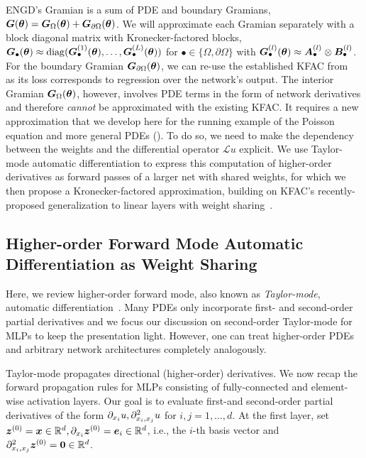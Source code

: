 ENGD's Gramian is a sum of PDE and boundary Gramians, ${\bm{G}}({\bm{\theta}})= {\bm{G}}_\Omega({\bm{\theta}}) + {\bm{G}}_{\partial\Omega}({\bm{\theta}})$.
We will approximate each Gramian separately with a block diagonal matrix with Kronecker-factored blocks, ${\bm{G}}_{\bullet}({\bm{\theta}}) \approx \operatorname{diag}({\bm{G}}^{(1)}_{\bullet}({\bm{\theta}}), \dots, {\bm{G}}^{(L)}_{\bullet}({\bm{\theta}}))$ for $\bullet \in \{\Omega, \partial\Omega\}$ with ${\bm{G}}^{(l)}_{\bullet}({\bm{\theta}}) \approx {\bm{A}}^{(l)}_{\bullet} \otimes {\bm{B}}^{(l)}_{\bullet}$.
For the boundary Gramian ${\bm{G}}_{\partial\Omega}({\bm{\theta}})$, we can re-use the established KFAC from~ as its loss corresponds to regression over the network's output.
The interior Gramian ${\bm{G}}_\Omega({\bm{\theta}})$, however, involves PDE terms in the form of network derivatives and therefore \emph{cannot} be approximated with the existing KFAC.
It requires a new approximation that we develop here for the running example of the Poisson equation and more general PDEs ().
To do so, we need to make the dependency between the weights and the differential operator $\mathcal{L}u$ explicit.
We use Taylor-mode automatic differentiation to express this computation of higher-order derivatives as forward passes of a larger net with shared weights, for which we then propose a Kronecker-factored approximation, building on KFAC's recently-proposed generalization to linear layers with weight sharing~\cite{eschenhagen2023kroneckerfactored}.

\subsection{Higher-order Forward Mode Automatic Differentiation as Weight Sharing}\label{sec:taylor-mode-AD}

Here, we review higher-order forward mode, also known as \emph{Taylor-mode}, automatic differentiation~\citep[][tutorial in ]{griewank1996algorithm, griewank2008evaluating, bettencourt2019taylor}.
Many PDEs only incorporate first- and second-order partial derivatives and we focus our discussion on second-order Taylor-mode for MLPs to keep the presentation light.
However, one can treat higher-order PDEs and arbitrary network architectures completely analogously.

Taylor-mode propagates directional (higher-order) derivatives.
We now recap the forward propagation rules for MLPs consisting of fully-connected and element-wise activation layers.
Our goal is to evaluate first-and second-order partial derivatives of the form $\partial_{{x}_i}u, \partial^2_{{x}_i, {x}_j}u$ for $i,j = 1, \dots, d$.
At the first layer, set ${\bm{z}}^{(0)} = {\bm{x}}\in\mathbb R^d, \partial_{x_i}{\bm{z}}^{(0)} = {\bm{e}}_i\in\mathbb R^d$, i.e., the $i$-th basis vector and $\partial^2_{x_i,x_j}{\bm{z}}^{(0)} = {\bm{0}} \in\mathbb R^d$.

